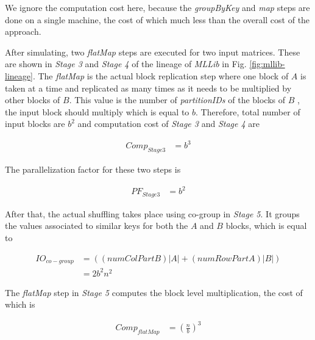 We ignore the computation cost here, because the \textit{groupByKey} and \textit{map} steps are done on a single machine, the cost of which much less than the overall cost of the approach.

After simulating, two \textit{flatMap} steps are executed for two input matrices. These are shown in \textit{Stage 3} and \textit{Stage 4} of the lineage of \textit{MLLib} in Fig. \ref{fig:mllib-lineage}. The \textit{flatMap} is the actual block replication step where one block of $A$ is taken at a time and replicated as many times as it needs to be multiplied by other blocks of $B$. This value is the number of \textit{partitionIDs} of the blocks of $B$ , the input block should multiply which is equal to $b$. Therefore, total number of input blocks are $b^{2}$ and computation cost of \textit{Stage 3} and \textit{Stage 4} are

\begin{equation}
\begin{aligned}
Comp_{Stage3}&=b^{3}
\end{aligned}
\end{equation}

The parallelization factor for these two steps is

\begin{equation}
\begin{aligned}
PF_{Stage3}&=b^{2}
\end{aligned}
\end{equation}

After that, the actual shuffling takes place using co-group in \textit{Stage 5}. It groups the values associated to similar keys for both the $A$ and $B$ blocks, which is equal to 

\begin{equation}
\begin{aligned}
IO_{co-group}&=((numColPartB)\left | A \right |+(numRowPartA)\left | B \right |) \\
&=2b^{2}n^{2}
\end{aligned}
\end{equation}

The \textit{flatMap} step in \textit{Stage 5} computes the block level multiplication, the cost of which is 

\begin{equation}
\begin{aligned}
Comp_{flatMap}&=(\frac{n}{b})^{3} \\
\end{aligned}
\end{equation}

